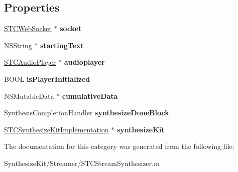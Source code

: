 \subsection*{Properties}
\begin{DoxyCompactItemize}
\item 
\hypertarget{category_s_t_c_stream_synthesizer_07_08_aa7264808e2ea2573aa416c6d7b176e89}{}\label{category_s_t_c_stream_synthesizer_07_08_aa7264808e2ea2573aa416c6d7b176e89} 
\hyperlink{interface_s_t_c_web_socket}{S\+T\+C\+Web\+Socket} $\ast$ {\bfseries socket}
\item 
\hypertarget{category_s_t_c_stream_synthesizer_07_08_a1fa65a38c7a9d809d0cb4ed8ca052d72}{}\label{category_s_t_c_stream_synthesizer_07_08_a1fa65a38c7a9d809d0cb4ed8ca052d72} 
N\+S\+String $\ast$ {\bfseries starting\+Text}
\item 
\hypertarget{category_s_t_c_stream_synthesizer_07_08_ae69dc2e2054408ad00b56af745f557ab}{}\label{category_s_t_c_stream_synthesizer_07_08_ae69dc2e2054408ad00b56af745f557ab} 
\hyperlink{interface_s_t_c_audio_player}{S\+T\+C\+Audio\+Player} $\ast$ {\bfseries audioplayer}
\item 
\hypertarget{category_s_t_c_stream_synthesizer_07_08_a94b81c71fc00540feefe132778fd0db7}{}\label{category_s_t_c_stream_synthesizer_07_08_a94b81c71fc00540feefe132778fd0db7} 
B\+O\+OL {\bfseries is\+Player\+Initialized}
\item 
\hypertarget{category_s_t_c_stream_synthesizer_07_08_a3552b0f61e3ef3cd718bc2c7b51cd931}{}\label{category_s_t_c_stream_synthesizer_07_08_a3552b0f61e3ef3cd718bc2c7b51cd931} 
N\+S\+Mutable\+Data $\ast$ {\bfseries cumulative\+Data}
\item 
\hypertarget{category_s_t_c_stream_synthesizer_07_08_adff44509294ed45df47fb819ae6bfe04}{}\label{category_s_t_c_stream_synthesizer_07_08_adff44509294ed45df47fb819ae6bfe04} 
Synthesis\+Completion\+Handler {\bfseries synthesize\+Done\+Block}
\item 
\hypertarget{category_s_t_c_stream_synthesizer_07_08_ae39d94daea35db5c53bf1b908a2bfa62}{}\label{category_s_t_c_stream_synthesizer_07_08_ae39d94daea35db5c53bf1b908a2bfa62} 
\hyperlink{interface_s_t_c_synthesize_kit_implementation}{S\+T\+C\+Synthesize\+Kit\+Implementation} $\ast$ {\bfseries synthesize\+Kit}
\end{DoxyCompactItemize}


The documentation for this category was generated from the following file\+:\begin{DoxyCompactItemize}
\item 
Synthesize\+Kit/\+Streamer/S\+T\+C\+Stream\+Synthesizer.\+m\end{DoxyCompactItemize}
